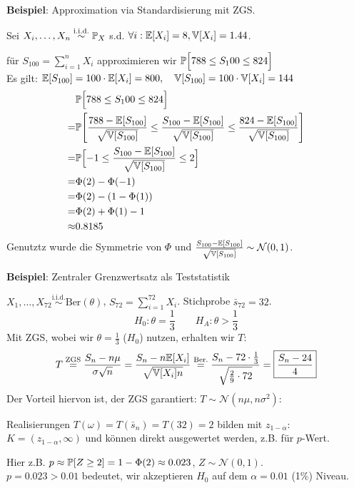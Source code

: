 {\footnotesize
    \textbf{Beispiel}: Approximation via Standardisierung mit ZGS.

    Sei $X_i,\ldots,X_n \overset{\text{i.i.d.}}{\sim} \P_X$ s.d. $\forall i: \E[X_i]=8, \V[X_i]=1.44$.

    für $S_{100} = \sum_{i=1}^{n}X_i$ approximieren wir $\P\Bigl[ 788 \leq S_100 \leq 824 \Bigr]$\\
    Es gilt: $\E[S_{100}] = 100\cdot\E[X_i] = 800,\quad \V[S_{100}]=100\cdot\V[X_i] = 144$
    \begin{align*}
            &\P\Bigl[ 788 \leq S_100 \leq 824 \Bigr] \\
        =   &\P\Biggl[\frac{788 - \E[S_{100}]}{\sqrt{\V[S_{100}]}} \leq \frac{S_{100} - \E[S_{100}]}{\sqrt{\V[S_{100}]}} \leq \frac{824 - \E[S_{100}]}{\sqrt{\V[S_{100}]}}\Biggr] \\
        =   &\P\Bigl[ -1 \leq \frac{S_{100} - \E[S_{100}]}{\sqrt{\V[S_{100}]}} \leq 2 \Bigr] \\
        =   & \Phi(2) - \Phi(-1)    \\
        =   & \Phi(2) - (1-\Phi(1)) \\
        =   & \Phi(2) + \Phi(1) - 1 \\
        \approx & 0.8185   
    \end{align*} 
    Genutztz wurde die Symmetrie von $\Phi$ und $\frac{S_{100} - \E[S_{100}]}{\sqrt{\V[S_{100}]}} \sim \mathcal{N}(0,1)$.\\
}

{\footnotesize
    \textbf{Beispiel}: Zentraler Grenzwertsatz als Teststatistik

    $X_1,\ldots,X_{72} \overset{\text{i.i.d.}}{\sim} \text{Ber}(\theta)$, $S_{72} = \sum_{i=1}^{72} X_i$. Stichprobe $\bar{s}_{72}=32$.
    $$
        H_0: \theta = \frac{1}{3} \qquad H_A: \theta > \frac{1}{3}
    $$
    Mit ZGS, wobei wir $\theta = \frac{1}{3}$ ($H_0$) nutzen, erhalten wir $T$:
    $$
        T \overset{\text{ZGS}}{=} \frac{S_n - n\mu}{\sigma\sqrt{n}} = \frac{S_n - n\E[X_i]}{\sqrt{\V[X_i]n}} \overset{\text{Ber.}}{=} \frac{S_n - 72\cdot\frac{1}{3}}{\sqrt{\frac{2}{9}\cdot 72}} = \boxed{\frac{S_n-24}{4}}
    $$
    Der Vorteil hiervon ist, der ZGS garantiert: $T \sim \mathcal{N}(n\mu, n\sigma^2)$:

    Realisierungen $T(\omega) = T(\bar{s}_n) = T(32) = 2$ bilden mit $z_{1-\alpha}$: $K = (z_{1-\alpha},\infty)$ und können direkt ausgewertet werden, z.B. für $p$-Wert.

    Hier z.B. $p \approx \P[Z \geq 2] = 1 - \Phi(2)\approx 0.023$, $Z \sim \mathcal{N}(0,1)$.\\
    $p=0.023>0.01$ bedeutet, wir akzeptieren $H_0$ auf dem $\alpha=0.01$ (1\%) Niveau.
}